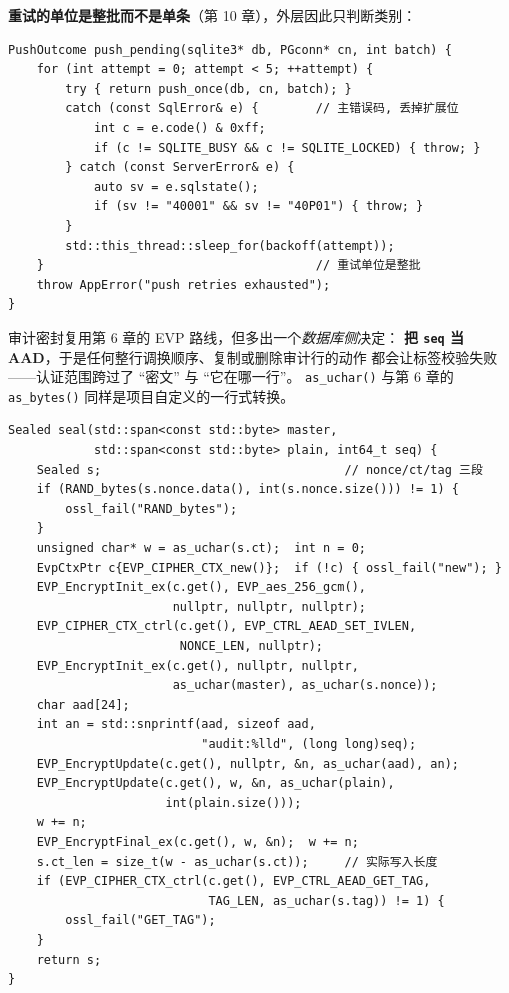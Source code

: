 \documentclass[12pt,a4paper,fontset=fandol]{ctexbook}
\newcommand{\Fn}[1]{\texttt{#1()}}
\newcommand{\Tp}[1]{\texttt{#1}}
\begin{document}
\textbf{重试的单位是整批而不是单条}（第 10 章），外层因此只判断类别：

\begin{lstlisting}[caption={C/C++：按错误类别决定重放还是上抛}]
PushOutcome push_pending(sqlite3* db, PGconn* cn, int batch) {
    for (int attempt = 0; attempt < 5; ++attempt) {
        try { return push_once(db, cn, batch); }
        catch (const SqlError& e) {        // 主错误码, 丢掉扩展位
            int c = e.code() & 0xff;
            if (c != SQLITE_BUSY && c != SQLITE_LOCKED) { throw; }
        } catch (const ServerError& e) {
            auto sv = e.sqlstate();
            if (sv != "40001" && sv != "40P01") { throw; }
        }
        std::this_thread::sleep_for(backoff(attempt));
    }                                      // 重试单位是整批
    throw AppError("push retries exhausted");
}
\end{lstlisting}

审计密封复用第 6 章的 EVP 路线，但多出一个\emph{数据库侧}决定：
\textbf{把 \Tp{seq} 当 AAD}，于是任何整行调换顺序、复制或删除审计行的动作
都会让标签校验失败——认证范围跨过了 ``密文'' 与 ``它在哪一行''。
\Fn{as\_uchar} 与第 6 章的 \Fn{as\_bytes} 同样是项目自定义的一行式转换。

\begin{lstlisting}[caption={C/C++：AES-256-GCM 密封会话密钥与审计行}]
Sealed seal(std::span<const std::byte> master,
            std::span<const std::byte> plain, int64_t seq) {
    Sealed s;                                  // nonce/ct/tag 三段
    if (RAND_bytes(s.nonce.data(), int(s.nonce.size())) != 1) {
        ossl_fail("RAND_bytes");
    }
    unsigned char* w = as_uchar(s.ct);  int n = 0;
    EvpCtxPtr c{EVP_CIPHER_CTX_new()};  if (!c) { ossl_fail("new"); }
    EVP_EncryptInit_ex(c.get(), EVP_aes_256_gcm(),
                       nullptr, nullptr, nullptr);
    EVP_CIPHER_CTX_ctrl(c.get(), EVP_CTRL_AEAD_SET_IVLEN,
                        NONCE_LEN, nullptr);
    EVP_EncryptInit_ex(c.get(), nullptr, nullptr,
                       as_uchar(master), as_uchar(s.nonce));
    char aad[24];
    int an = std::snprintf(aad, sizeof aad,
                           "audit:%lld", (long long)seq);
    EVP_EncryptUpdate(c.get(), nullptr, &n, as_uchar(aad), an);
    EVP_EncryptUpdate(c.get(), w, &n, as_uchar(plain),
                      int(plain.size()));
    w += n;
    EVP_EncryptFinal_ex(c.get(), w, &n);  w += n;
    s.ct_len = size_t(w - as_uchar(s.ct));     // 实际写入长度
    if (EVP_CIPHER_CTX_ctrl(c.get(), EVP_CTRL_AEAD_GET_TAG,
                            TAG_LEN, as_uchar(s.tag)) != 1) {
        ossl_fail("GET_TAG");
    }
    return s;
}
\end{lstlisting}
\end{document}
